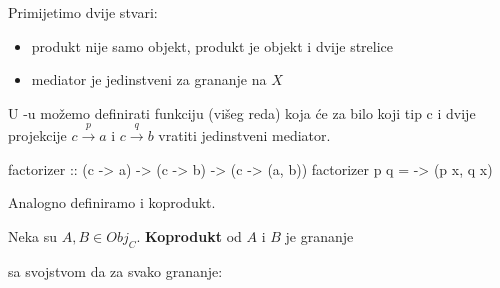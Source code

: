   Primijetimo dvije stvari:
  \begin{itemize}
    \item produkt nije samo objekt, produkt je objekt i dvije strelice
    \item mediator je jedinstveni za grananje na $X$
  \end{itemize}
  U -u možemo definirati funkciju (višeg reda)
   koja će za bilo koji tip c i dvije projekcije $c
  \xrightarrow{p} a$ i $c \xrightarrow{q} b$ vratiti jedinstveni mediator.
  \begin{mcode}
    factorizer :: (c -> a) -> (c -> b) -> (c -> (a, b))
    factorizer p q = \x -> (p x, q x)
  \end{mcode}
  Analogno definiramo i koprodukt.

  \begin{definition}
    Neka su $A, B \in Obj_C$. \textbf{Koprodukt} od $A$ i $B$ je grananje
  \begin{center}
  \end{center}
  sa svojstvom da za svako grananje:
  \begin{center}


\end{center}
\end{definition}
